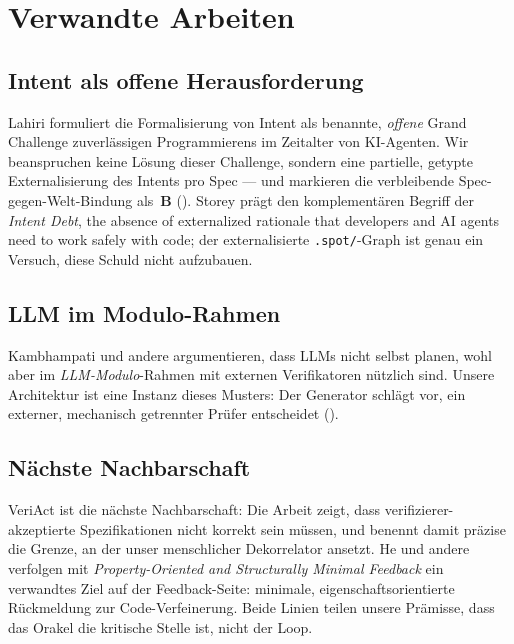 \documentclass[11pt,a4paper]{article}
\newcommand{\AB}[1]{\textbf{#1}}
\theoremstyle{definition}
\theoremstyle{remark}
\begin{document}
\section{Verwandte Arbeiten}
\label{sec:related}

\subsection{Intent als offene Herausforderung}
\label{sec:related-intent}

Lahiri \cite{lahiri2026} formuliert die Formalisierung von Intent als benannte,
\emph{offene} Grand Challenge zuverlässigen Programmierens im Zeitalter von
KI-Agenten. Wir beanspruchen keine Lösung dieser Challenge, sondern eine
partielle, getypte Externalisierung des Intents pro Spec --- und markieren die
verbleibende Spec-gegen-Welt-Bindung als~\AB{B} (). Storey
\cite{storey2026} prägt den komplementären Begriff der \emph{Intent Debt},
\glqq the absence of externalized rationale that developers and AI agents need to
work safely with code\grqq; der externalisierte \texttt{.spot/}-Graph ist genau
ein Versuch, diese Schuld nicht aufzubauen.

\subsection{LLM im Modulo-Rahmen}
\label{sec:related-modulo}

Kambhampati und andere \cite{kambhampati2024} argumentieren, dass LLMs nicht
selbst planen, wohl aber im \emph{LLM-Modulo}-Rahmen mit externen Verifikatoren
nützlich sind. Unsere Architektur ist eine Instanz dieses Musters: Der Generator
schlägt vor, ein externer, mechanisch getrennter Prüfer entscheidet
().

\subsection{Nächste Nachbarschaft}
\label{sec:related-veriact}

VeriAct \cite{veriact2026} ist die nächste Nachbarschaft: Die Arbeit zeigt, dass
verifizierer-akzeptierte Spezifikationen nicht korrekt sein müssen, und benennt
damit präzise die Grenze, an der unser menschlicher Dekorrelator ansetzt. He und
andere \cite{pgs2025} verfolgen mit \emph{Property-Oriented and Structurally
Minimal Feedback} ein verwandtes Ziel auf der Feedback-Seite: minimale,
eigenschaftsorientierte Rückmeldung zur Code-Verfeinerung. Beide Linien teilen
unsere Prämisse, dass das Orakel die kritische Stelle ist, nicht der Loop.
\end{document}
